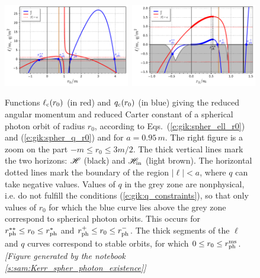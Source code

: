 \begin{figure}
\centerline{\includegraphics[width=0.49\textwidth]{gik_spher_orb_exist.pdf}\
\includegraphics[width=0.49\textwidth]{gik_spher_orb_exist_zoom.pdf}}
\caption[]{\label{f:gik:spher_orb_exist} \footnotesize
Functions $\ell_{\rm c}(r_0)$ (in red) and $q_{\rm c}(r_0)$ (in blue) giving the reduced angular momentum
and reduced Carter constant of a spherical photon orbit of radius $r_0$,
according to Eqs.~(\ref{e:gik:spher_ell_r0}) and (\ref{e:gik:spher_q_r0})
and for $a=0.95\, m$. The right figure is a zoom on the part
$-m\leq r_0 \leq 3m/2$. The thick vertical lines
mark the two horizons: $\mathscr{H}$ (black) and $\mathscr{H}_{\rm in}$ (light brown).
The horizontal dotted lines mark the boundary of the region $|\ell|<a$,
where $q$ can take negative values. Values of $q$ in the grey zone
are nonphysical, i.e. do not fulfill the conditions (\ref{e:gik:q_constraints}),
so that only values of $r_0$ for which the blue curve lies
above the grey zone correspond to spherical photon orbits. This occurs
for $r_{\rm ph}^{**} \leq r_0 \leq r_{\rm ph}^*$ and $r_{\rm ph}^+ \leq r_0 \leq r_{\rm ph}^-$.
The thick segments of the $\ell$ and $q$ curves correspond to stable orbits, for
which $0\leq r_0\leq r_{\rm ph}^{\rm ms}$.
\textsl{[Figure generated by the notebook \ref{s:sam:Kerr_spher_photon_existence}]}
}
\end{figure}

